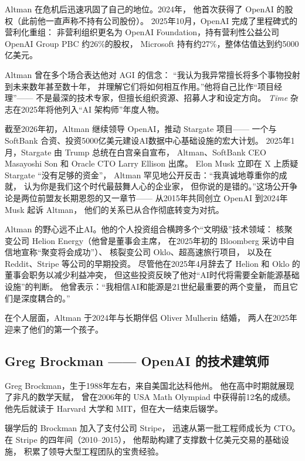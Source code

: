 Altman 在危机后迅速巩固了自己的地位。2024年，
他首次获得了 OpenAI 的股权（此前他一直声称不持有公司股份）。
2025年10月，OpenAI 完成了里程碑式的营利化重组：
非营利组织更名为 OpenAI Foundation，持有营利性公益公司 OpenAI Group PBC 约26\%的股权，
Microsoft 持有约27\%，整体估值达到约5000亿美元。

\begin{keybox}
Altman 曾在多个场合表达他对 AGI 的信念：
``我认为我异常擅长将多个事物投射到未来数年甚至数十年，
并理解它们将如何相互作用。''他将自己比作``项目经理''——
不是最深的技术专家，但擅长组织资源、招募人才和设定方向。
\emph{Time} 杂志在2025年将他列入``AI 架构师''年度人物。
\end{keybox}

截至2026年初，Altman 继续领导 OpenAI，推动 Stargate 项目——
一个与 SoftBank 合资、投资5000亿美元建设AI数据中心基础设施的宏大计划。
2025年1月，Stargate 由 Trump 总统在白宫亲自宣布，
Altman、SoftBank CEO Masayoshi Son 和 Oracle CTO Larry Ellison 出席。
Elon Musk 立即在 X 上质疑 Stargate ``没有足够的资金''，
Altman 罕见地公开反击：``我真诚地尊重你的成就，
认为你是我们这个时代最鼓舞人心的企业家，
但你说的是错的。''这场公开争论是两位前盟友长期恩怨的又一章节——
从2015年共同创立 OpenAI 到2024年 Musk 起诉 Altman，
他们的关系已从合作彻底转变为对抗。

Altman 的野心远不止AI。他的个人投资组合横跨多个``文明级''技术领域：
核聚变公司 Helion Energy（他曾是董事会主席，
在2025年初的 Bloomberg 采访中自信地宣称``聚变将会成功''）、
核裂变公司 Oklo、超高速旅行项目，
以及在 Reddit、Stripe 等公司的早期投资。
尽管他在2025年4月辞去了 Helion 和 Oklo 的董事会职务以减少利益冲突，
但这些投资反映了他对``AI时代将需要全新能源基础设施''的判断。
他曾表示：``我相信AI和能源是21世纪最重要的两个变量，
而且它们是深度耦合的。''

在个人层面，Altman 于2024年与长期伴侣 Oliver Mulherin 结婚，
两人在2025年迎来了他们的第一个孩子。


\subsection{Greg Brockman —— OpenAI 的技术建筑师}
\label{subsec:greg-brockman}

Greg Brockman，生于1988年左右，来自美国北达科他州。
他在高中时期就展现了非凡的数学天赋，
曾在2006年的 USA Math Olympiad 中获得前12名的成绩。
他先后就读于 Harvard 大学和 MIT，但在大一结束后辍学。

辍学后的 Brockman 加入了支付公司 Stripe，
迅速从第一批工程师成长为 CTO。
在 Stripe 的四年间（2010--2015），
他帮助构建了支撑数十亿美元交易的基础设施，
积累了领导大型工程团队的宝贵经验。

